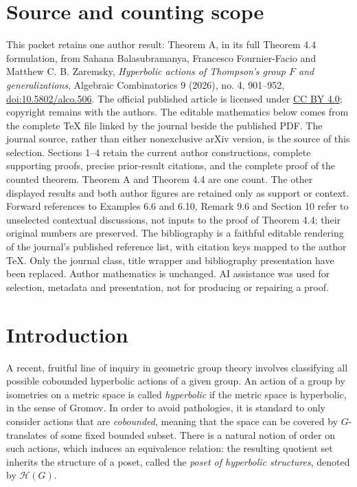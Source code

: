 \documentclass[10pt,a4paper]{article}
\theoremstyle{definition}
\theoremstyle{remark}
\newcommand{\Hyp}{\mathcal{H}}
\theoremstyle{plain}
\begin{document}
\section*{Source and counting scope}
This packet retains one author result: Theorem A, in its full Theorem 4.4 formulation, from
Sahana Balasubramanya, Francesco Fournier-Facio and Matthew C. B. Zaremsky,
\emph{Hyperbolic actions of Thompson's group $F$ and generalizations},
Algebraic Combinatorics 9 (2026), no. 4, 901--952,
\href{https://doi.org/10.5802/alco.506}{doi:10.5802/alco.506}.
The official published article is licensed under
\href{https://creativecommons.org/licenses/by/4.0/}{CC BY 4.0}; copyright remains with the authors.
The editable mathematics below comes from the complete TeX file linked by the journal beside the published PDF.
The journal source, rather than either nonexclusive arXiv version, is the source of this selection.
Sections 1--4 retain the current author constructions, complete supporting proofs, precise prior-result citations,
and the complete proof of the counted theorem. Theorem A and Theorem 4.4 are one count.
The other displayed results and both author figures are retained only as support or context.
Forward references to Examples 6.6 and 6.10, Remark 9.6 and Section 10 refer to unselected contextual discussions,
not inputs to the proof of Theorem 4.4; their original numbers are preserved.
The bibliography is a faithful editable rendering of the journal's published reference list, with citation keys mapped to the author TeX.
Only the journal class, title wrapper and bibliography presentation have been replaced. Author mathematics is unchanged.
AI assistance was used for selection, metadata and presentation, not for producing or repairing a proof.

\section*{Introduction}

A recent, fruitful line of inquiry in geometric group theory involves classifying all possible cobounded hyperbolic actions of a given group. An action of a group by isometries on a metric space is called \emph{hyperbolic} if the metric space is hyperbolic, in the sense of Gromov. In order to avoid pathologies, it is standard to only consider actions that are \emph{cobounded}, meaning that the space can be covered by $G$-translates of some fixed bounded subset. There is a natural notion of order on such actions, which induces an equivalence relation: the resulting quotient set inherits the structure of a poset, called the \emph{poset of hyperbolic structures}, denoted by $\Hyp(G)$.
\end{document}
